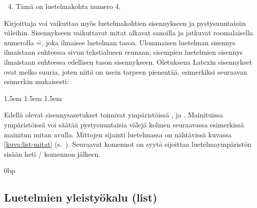 \begin{koodilohkosis}
  \begin{enumerate}
    \setcounter{enumi}{3}
    \item Tämä on luetelmakohta numero 4.
  \end{enumerate}
\end{koodilohkosis}

Kirjoittaja voi vaikuttaa myös luetelmakohtien sisennykseen ja
pystysuuntaisiin väleihin. Sisennykseen vaikuttavat mitat alkavat
sanoilla  ja jatkuvat roomalaisella numerolla
\==, joka ilmaisee luetelman tasoa. Ulommaisen
luetelman sisennys ilmaistaan suhteessa sivun tekstialueen reunaan;
sisempien luetelmien sisennys ilmaistaan suhteessa edellisen tason
sisennykseen. Oletuksena Latexin sisennykset ovat melko suuria, joten
niitä on usein tarpeen pienentää, esimerkiksi seuraavan esimerkin
mukaisesti:

\begin{koodilohkosis}
  \setlength{\leftmargini}  {1.5em} %
  \setlength{\leftmarginii} {1.5em}
  \setlength{\leftmarginiii}{1.5em}
  \setlength{\leftmarginiv} {1.5em}
\end{koodilohkosis}

Edellä olevat sisennysasetukset toimivat ympäristöissä
,  ja .
Mainituissa ympäristöissä voi säätää pystysuuntaisia välejä kolmen
seuraavassa esimerkissä mainitun mitan avulla. Mittojen sijainti
luetelmassa on nähtävissä kuvassa \ref{kuva:list-mitat}
(s.~\pageref{kuva:list-mitat}). Seuraavat komennot on syytä sijoittaa
luetelmaympäristön sisään heti \-/ komennon jälkeen.

\begin{koodilohkosis}
  \setlength{\parsep} {0bp}   %
  \setlength{\itemsep}{3bp}   %
  \setlength{\parskip}{1.2ex} %
\end{koodilohkosis}

\subsection{Luetelmien yleistyökalu (list)}
\label{luku:list-ymparisto}

